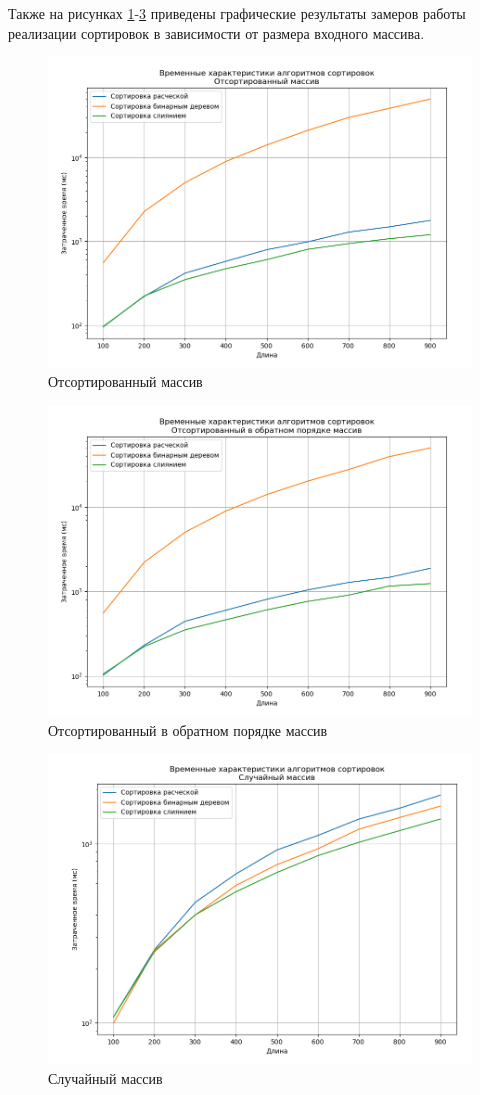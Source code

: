 Также на рисунках \ref{fig:sort}-\ref{fig:rand} приведены графические результаты замеров работы реализации сортировок в зависимости от размера входного массива.

\begin{figure}
	\centering
	\includegraphics[width=0.8\linewidth]{img/sort}
	\caption{Отсортированный массив}
	\label{fig:sort}
\end{figure}

\begin{figure}
	\centering
	\includegraphics[width=0.8\linewidth]{img/sort_back}
	\caption{Отсортированный в обратном порядке массив}
	\label{fig:sort_back}
\end{figure}

\begin{figure}[h!]
	\centering
	\includegraphics[width=0.8\linewidth]{img/rand}
	\caption{Случайный массив}
	\label{fig:rand}
\end{figure}


